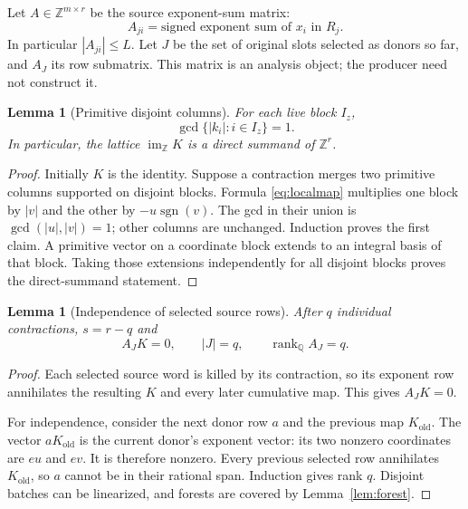 \documentclass[11pt,letterpaper]{article}
\newtheorem{lemma}[theorem]{Lemma}
\theoremstyle{definition}
\theoremstyle{remark}\newtheorem{remark}[theorem]{Remark}
\newcommand{\Z}{\mathbb Z}\newcommand{\Q}{\mathbb Q}
\newcommand{\rank}{\operatorname{rank}}
\newcommand{\im}{\operatorname{im}}
\newcommand{\sgn}{\operatorname{sgn}}
\begin{document}
Let $A\in\Z^{m\times r}$ be the source exponent-sum matrix:
\[
 A_{ji}=\text{signed exponent sum of }x_i\text{ in }R_j.
\]
In particular $|A_{ji}|\le L$. Let $J$ be the set of original slots selected
as donors so far, and $A_J$ its row submatrix. This matrix is an analysis
object; the producer need not construct it.

\begin{lemma}[Primitive disjoint columns]
\label{lem:primitivecolumns}
For each live block $I_z$,
\[
 \gcd\{|k_i|:i\in I_z\}=1.
\]
In particular, the lattice $\im_{\Z}K$ is a direct summand of $\Z^r$.
\end{lemma}
\begin{proof}
Initially $K$ is the identity. Suppose a contraction merges two primitive
columns supported on disjoint blocks. Formula \eqref{eq:localmap} multiplies
one block by $|v|$ and the other by $-u\sgn(v)$. The gcd in their union is
$\gcd(|u|,|v|)=1$; other columns are unchanged. Induction proves the first
claim. A primitive vector on a coordinate block extends to an integral basis
of that block. Taking those extensions independently for all disjoint blocks
proves the direct-summand statement.
\end{proof}

\begin{lemma}[Independence of selected source rows]
\label{lem:rowrank}
After $q$ individual contractions, $s=r-q$ and
\[
 A_JK=0,\qquad |J|=q,\qquad \rank_{\Q}A_J=q.
\]
\end{lemma}
\begin{proof}
Each selected source word is killed by its contraction, so its exponent row
annihilates the resulting $K$ and every later cumulative map. This gives
$A_JK=0$.

For independence, consider the next donor row $a$ and the previous map
$K_{\mathrm{old}}$. The vector $aK_{\mathrm{old}}$ is the current donor's
exponent vector: its two nonzero coordinates are $eu$ and $ev$. It is
therefore nonzero. Every previous selected row annihilates
$K_{\mathrm{old}}$, so $a$ cannot be in their rational span. Induction gives
rank $q$. Disjoint batches can be linearized, and forests are covered by
Lemma~\ref{lem:forest}.
\end{proof}
\end{document}
